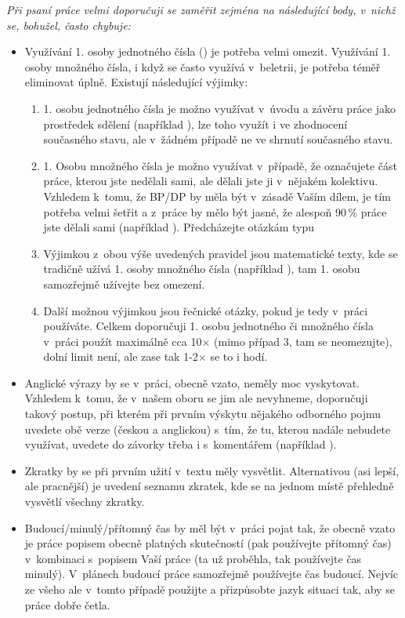 \it Při psaní práce velmi doporučuji se zaměřit zejména na následující body, v~nichž se, bohužel, často chybuje: 
\begin{itemize}
  \item{Využívání 1. osoby jednotného čísla () je potřeba velmi omezit. Využívání 1. osoby množného čísla, i když se často využívá v~beletrii, je potřeba téměř eliminovat úplně. Existují následující výjimky:
    \begin{enumerate}
      \item{1. osobu jednotného čísla je možno využívat v~úvodu a závěru práce jako prostředek sdělení  (například ), lze toho využít i ve zhodnocení současného stavu, ale v~žádném případě ne ve shrnutí současného stavu.}
      \item{1. Osobu množného čísla je možno využívat v~případě, že označujete část práce, kterou jste nedělali sami, ale dělali jste ji v~nějakém kolektivu. Vzhledem k~tomu, že BP/DP by měla být v~zásadě Vaším dílem, je tím potřeba velmi šetřit a z~práce by mělo být jasné, že alespoň 90\,\% práce jste dělali sami (například ). Předcházejte otázkám typu }
      \item{Výjimkou z~obou výše uvedených pravidel jsou matematické texty, kde se tradičně užívá 1. osoby množného čísla (například ), tam 1. osobu samozřejmě užívejte bez omezení.}
      \item{Další možnou výjimkou jsou řečnické otázky, pokud je tedy v~práci používáte. Celkem doporučuji 1. osobu jednotného či množného čísla v~práci použít maximálně cca 10$\times$ (mimo případ 3, tam se neomezujte), dolní limit není, ale zase tak 1-2$\times$ se to i hodí.}
    \end{enumerate}}
  \item{Anglické výrazy by se v~práci, obecně vzato, neměly moc vyskytovat. Vzhledem k~tomu, že v~našem oboru se jim ale nevyhneme, doporučuji takový postup, při kterém při prvním výskytu nějakého odborného pojmu uvedete obě verze (českou a anglickou) s~tím, že tu, kterou nadále nebudete využívat, uvedete do závorky třeba i s~komentářem (například ).}
  \item{Zkratky by se při prvním užití v~textu měly vysvětlit. Alternativou (asi lepší, ale pracnější) je uvedení seznamu zkratek, kde se na jednom místě přehledně vysvětlí všechny zkratky.}
  \item{Budoucí/minulý/přítomný čas by měl být v~práci pojat tak, že obecně vzato je práce popisem obecně platných skutečností (pak používejte přítomný čas) v~kombinaci s~popisem Vaší práce (ta už proběhla, 
tak používejte čas minulý). V~plánech budoucí práce samozřejmě používejte čas budoucí. Nejvíc ze 
všeho ale v~tomto případě použijte  a přizpůsobte jazyk situaci tak, aby se práce dobře četla.}
\end{itemize}
\rm


